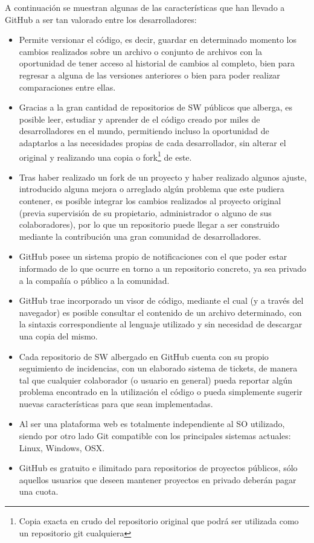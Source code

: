 A continuación se muestran algunas de las características que han llevado a GitHub a ser tan valorado entre los desarrolladores\cite{quintana2015}:

\begin{itemize}
	\item Permite versionar el código, es decir, guardar en determinado momento los cambios realizados sobre un archivo o conjunto de archivos con la oportunidad de tener acceso al historial de cambios al completo, bien para regresar a alguna de las versiones anteriores o bien para poder realizar comparaciones entre ellas.
	\item Gracias a la gran cantidad de repositorios de \gls{SW} públicos que alberga, es posible leer, estudiar y aprender de el código creado por miles de desarrolladores en el mundo, permitiendo incluso la oportunidad de adaptarlos a las necesidades propias de cada desarrollador, sin alterar el original y realizando una copia o fork\footnote{Copia exacta en crudo del repositorio original que podrá ser utilizada como un repositorio git cualquiera} de este.
	\item Tras haber realizado un fork de un proyecto y haber realizado algunos ajuste, introducido alguna mejora o arreglado algún problema que este pudiera contener, es posible integrar los cambios realizados al proyecto original (previa supervisión de su propietario, administrador o alguno de sus colaboradores), por lo que un repositorio puede llegar a ser construido mediante la contribución una gran comunidad de desarrolladores.
	\item GitHub posee un sistema propio de notificaciones con el que poder estar informado de lo que ocurre en torno a un repositorio concreto, ya sea privado a la compañía o público a la comunidad.
	\item GitHub trae incorporado un visor de código, mediante el cual (y a través del navegador) es posible consultar el contenido de un archivo determinado, con la sintaxis correspondiente al lenguaje utilizado y sin necesidad de descargar una copia del mismo.
	\item Cada repositorio de \gls{SW} albergado en GitHub cuenta con su propio seguimiento de incidencias, con un elaborado sistema de tickets, de manera tal que cualquier colaborador (o usuario en general) pueda reportar algún problema encontrado en la utilización el código o pueda simplemente sugerir nuevas características para que sean implementadas.
	\item Al ser una plataforma web es totalmente independiente al \gls{SO} utilizado, siendo por otro lado Git compatible con los principales sistemas actuales: Linux, Windows, OSX.
	\item GitHub es gratuito e ilimitado para repositorios de proyectos públicos, sólo aquellos usuarios que deseen mantener proyectos en privado deberán pagar una cuota. 
\end{itemize}


